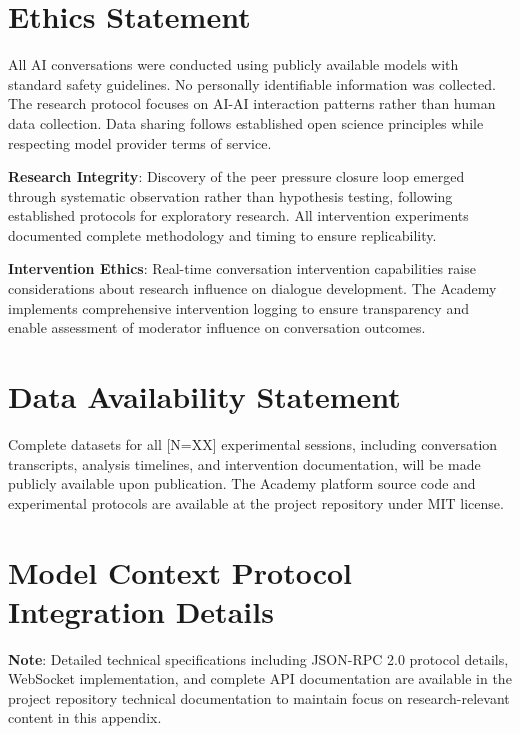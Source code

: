 \documentclass[11pt,letterpaper]{article}
\newcommand{\theacademy}{The Academy}
\newcommand{\totalSessions}{[N=XX]} %
\begin{document}
\section*{Ethics Statement}

All AI conversations were conducted using publicly available models with standard safety guidelines. No personally identifiable information was collected. The research protocol focuses on AI-AI interaction patterns rather than human data collection. Data sharing follows established open science principles while respecting model provider terms of service.

\textbf{Research Integrity}: Discovery of the peer pressure closure loop emerged through systematic observation rather than hypothesis testing, following established protocols for exploratory research. All intervention experiments documented complete methodology and timing to ensure replicability.

\textbf{Intervention Ethics}: Real-time conversation intervention capabilities raise considerations about research influence on dialogue development. \theacademy{} implements comprehensive intervention logging to ensure transparency and enable assessment of moderator influence on conversation outcomes.

\section*{Data Availability Statement}

Complete datasets for all \totalSessions{} experimental sessions, including conversation transcripts, analysis timelines, and intervention documentation, will be made publicly available upon publication. \theacademy{} platform source code and experimental protocols are available at the project repository under MIT license.




\appendix

\section{Model Context Protocol Integration Details}
\label{app:mcp}

\textbf{Note}: Detailed technical specifications including JSON-RPC 2.0 protocol details, WebSocket implementation, and complete API documentation are available in the project repository technical documentation to maintain focus on research-relevant content in this appendix.
\end{document}
